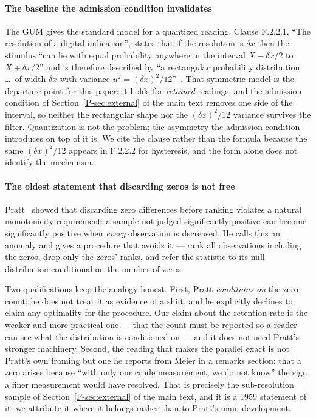 \documentclass[10pt,journal,onecolumn]{IEEEtran}
\newcommand{\mainModeB}{\ref{P-sec:external}}              %
\begin{document}
\paragraph{The baseline the admission condition invalidates}
The GUM gives the standard model for a quantized reading. Clause F.2.2.1, ``The resolution of
a digital indication'', states that if the resolution is $\delta x$ then the stimulus ``can lie
with equal probability anywhere in the interval $X - \delta x/2$ to $X + \delta x/2$'' and is
therefore described by ``a rectangular probability distribution \ldots\ of width $\delta x$
with variance $u^2 = (\delta x)^2/12$''~\cite{jcgm100}. That symmetric model is the departure
point for this paper: it holds for \emph{retained} readings, and the admission condition of
Section~\mainModeB{} of the main text removes one side of the interval, so neither the rectangular shape
nor the $(\delta x)^2/12$ variance survives the filter. Quantization is not the problem; the
asymmetry the admission condition introduces on top of it is. We cite the clause rather than the formula
because the same $(\delta x)^2/12$ appears in F.2.2.2 for hysteresis, and the form alone does
not identify the mechanism.

\paragraph{The oldest statement that discarding zeros is not free}
Pratt~\cite{pratt1959zeros} showed that discarding zero differences before ranking violates a
natural monotonicity requirement: a sample not judged significantly positive can become
significantly positive when \emph{every} observation is decreased. He calls this an anomaly
and gives a procedure that avoids it --- rank all observations including the zeros, drop only
the zeros' ranks, and refer the statistic to its null distribution conditional on the number
of zeros.

Two qualifications keep the analogy honest. First, Pratt \emph{conditions on} the zero count;
he does not treat it as evidence of a shift, and he explicitly declines to claim any optimality
for the procedure. Our claim about the retention rate is the weaker and more practical one ---
that the count must be reported so a reader can see what the distribution is conditioned on
--- and it does not need Pratt's stronger machinery. Second, the reading that makes the
parallel exact is not Pratt's own framing but one he reports from Meier in a remarks section:
that a zero arises because ``with only our crude measurement, we do not know'' the sign a
finer measurement would have resolved. That is precisely the sub-resolution sample of
Section~\mainModeB{} of the main text, and it is a 1959 statement of it; we attribute it where it belongs
rather than to Pratt's main development.
\end{document}
